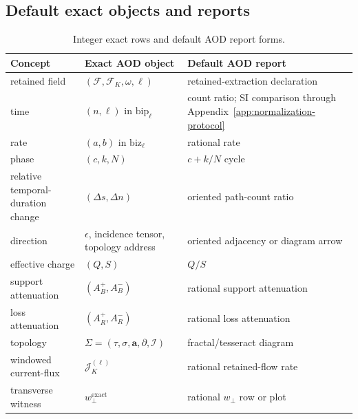 \subsection{Default exact objects and reports}
\label{man:exact-report-table}

\begin{table}[H]
\centering
\caption{Integer exact rows and default AOD report forms.}
\label{tab:integer-exact-rows-report-normalization}
\begin{threeparttable}
\small
\begin{tabularx}{\linewidth}{@{}lXX@{}}
\toprule
Concept & Exact AOD object & Default AOD report \\
\midrule
retained field & \((\mathcal F,\mathcal F_K,\omega,\ell)\) & retained-extraction declaration \\
time & \((n,\ell)\) in \(\mathrm{bip}_{\ell}\) & count ratio; SI comparison through Appendix~\ref{app:normalization-protocol} \\
rate & \((a,b)\) in \(\mathrm{biz}_{\ell}\) & rational rate \\
phase & \((c,k,N)\) & \(c+k/N\) cycle \\
relative temporal-duration change & \((\Delta s,\Delta n)\) & oriented path-count ratio \\
direction & \(\epsilon\), incidence tensor, topology address & oriented adjacency or diagram arrow \\
effective charge & \((Q,S)\) & \(Q/S\) \\
support attenuation & \((A_B^+,A_B^-)\) & rational support attenuation \\
loss attenuation & \((A_R^+,A_R^-)\) & rational loss attenuation \\
topology & \(\Sigma=(\tau,\sigma,\mathbf a,\partial,\mathcal I)\) & fractal/tesseract diagram \\
windowed current-flux & \(\mathcal J_K^{(\ell)}\) & rational retained-flow rate \\
transverse witness & \(w_\perp^{\mathrm{exact}}\) & rational \(w_\perp\) row or plot \\
\bottomrule
\end{tabularx}
\end{threeparttable}
\end{table}

